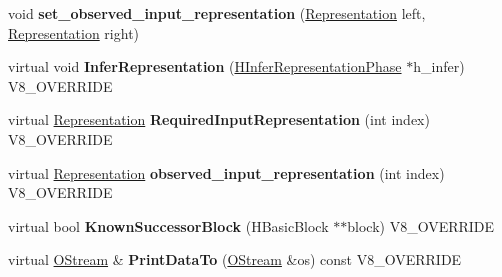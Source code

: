 \begin{DoxyCompactItemize}
\item 
\hypertarget{classv8_1_1internal_1_1_h_compare_numeric_and_branch_a249003723415949ca1bb4a110fec595e}{}void {\bfseries set\+\_\+observed\+\_\+input\+\_\+representation} (\hyperlink{classv8_1_1internal_1_1_representation}{Representation} left, \hyperlink{classv8_1_1internal_1_1_representation}{Representation} right)\label{classv8_1_1internal_1_1_h_compare_numeric_and_branch_a249003723415949ca1bb4a110fec595e}

\item 
\hypertarget{classv8_1_1internal_1_1_h_compare_numeric_and_branch_ad7e1a31ce2781d274a4fd8c15196f1fb}{}virtual void {\bfseries Infer\+Representation} (\hyperlink{classv8_1_1internal_1_1_h_infer_representation_phase}{H\+Infer\+Representation\+Phase} $\ast$h\+\_\+infer) V8\+\_\+\+O\+V\+E\+R\+R\+I\+D\+E\label{classv8_1_1internal_1_1_h_compare_numeric_and_branch_ad7e1a31ce2781d274a4fd8c15196f1fb}

\item 
\hypertarget{classv8_1_1internal_1_1_h_compare_numeric_and_branch_a2aa53c694f6a07a7b8ff466fbdfe2d57}{}virtual \hyperlink{classv8_1_1internal_1_1_representation}{Representation} {\bfseries Required\+Input\+Representation} (int index) V8\+\_\+\+O\+V\+E\+R\+R\+I\+D\+E\label{classv8_1_1internal_1_1_h_compare_numeric_and_branch_a2aa53c694f6a07a7b8ff466fbdfe2d57}

\item 
\hypertarget{classv8_1_1internal_1_1_h_compare_numeric_and_branch_ad52a2deb13f9d2ebb7f06f1d06f80deb}{}virtual \hyperlink{classv8_1_1internal_1_1_representation}{Representation} {\bfseries observed\+\_\+input\+\_\+representation} (int index) V8\+\_\+\+O\+V\+E\+R\+R\+I\+D\+E\label{classv8_1_1internal_1_1_h_compare_numeric_and_branch_ad52a2deb13f9d2ebb7f06f1d06f80deb}

\item 
\hypertarget{classv8_1_1internal_1_1_h_compare_numeric_and_branch_a8068ae98deae958cb9eb2c6617c2b0d4}{}virtual bool {\bfseries Known\+Successor\+Block} (H\+Basic\+Block $\ast$$\ast$block) V8\+\_\+\+O\+V\+E\+R\+R\+I\+D\+E\label{classv8_1_1internal_1_1_h_compare_numeric_and_branch_a8068ae98deae958cb9eb2c6617c2b0d4}

\item 
\hypertarget{classv8_1_1internal_1_1_h_compare_numeric_and_branch_a27a95ac082a16c7cbdf0a80be84a31fa}{}virtual \hyperlink{classv8_1_1internal_1_1_o_stream}{O\+Stream} \& {\bfseries Print\+Data\+To} (\hyperlink{classv8_1_1internal_1_1_o_stream}{O\+Stream} \&os) const V8\+\_\+\+O\+V\+E\+R\+R\+I\+D\+E\label{classv8_1_1internal_1_1_h_compare_numeric_and_branch_a27a95ac082a16c7cbdf0a80be84a31fa}


\end{DoxyCompactItemize}
